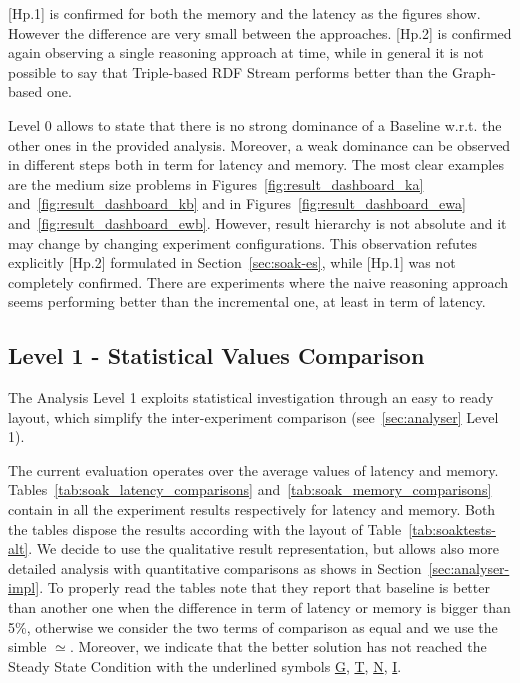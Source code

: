 [Hp.1] is confirmed for both the memory and the latency as the figures show. However the difference are very small between the approaches. [Hp.2] is confirmed again observing a single reasoning approach at time, while in general it is not possible to say that Triple-based RDF Stream performs better than the Graph-based one.

Level 0 allows to state that there is no strong dominance of a Baseline w.r.t. the other ones in the provided analysis. Moreover, a weak dominance can be observed in different steps both in term for latency  and memory. The most clear examples are the medium size problems in Figures~\ref{fig:result_dashboard_ka} and~\ref{fig:result_dashboard_kb} and in Figures~\ref{fig:result_dashboard_ewa} and~\ref{fig:result_dashboard_ewb}. However, result hierarchy is not absolute and it may change by changing experiment configurations. This observation refutes explicitly [Hp.2] formulated in Section~\ref{sec:soak-es}, while [Hp.1] was not completely confirmed. There are experiments where the naive  reasoning  approach seems performing better than the incremental one, at least in term of latency. 


%


\subsection{Level 1 - Statistical Values Comparison}\label{sec:eval-level1}

The Analysis Level 1 exploits statistical investigation through an easy to ready layout, which simplify the inter-experiment comparison (see~\ref{sec:analyser} Level 1).



The current evaluation operates over the average values of latency and memory. Tables~\ref{tab:soak_latency_comparisons} and~\ref{tab:soak_memory_comparisons} contain in all the experiment results respectively for latency and memory.  Both the tables dispose the results according with the layout of Table~\ref{tab:soaktests-alt}. We decide to use the qualitative result representation, but \name allows also more detailed analysis with quantitative comparisons as shows in Section~\ref{sec:analyser-impl}. To properly read the tables note that they report that baseline is better than another one when the difference in term of latency or memory is bigger than 5\%, otherwise we consider the two terms of comparison as equal and we use the simble $\simeq$.
Moreover, we indicate that the better solution has not reached the Steady State Condition with the underlined symbols \underline{G}, \underline{T}, \underline{N}, \underline{I}.

